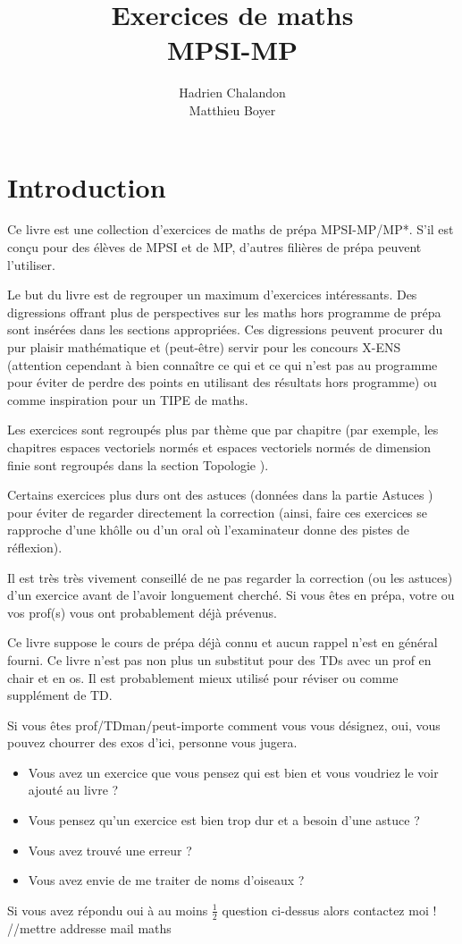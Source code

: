 \documentclass[12pt,a4paper]{book}
\title{Exercices de maths \\ MPSI-MP}
\author{Hadrien {\sc Chalandon} \\ Matthieu {\sc Boyer}}
\date{}
\theoremstyle{definition}
\theoremstyle{remark}
\begin{document}
\maketitle
\tableofcontents

\chapter*{Introduction}
Ce livre est une collection d'exercices de maths de prépa MPSI-MP/MP*. S'il est conçu pour des élèves de MPSI et de MP, d'autres filières de prépa peuvent l'utiliser.

Le but du livre est de regrouper un maximum d'exercices intéressants. Des digressions offrant plus de perspectives sur les maths hors programme de prépa sont insérées dans les sections appropriées. Ces digressions peuvent procurer du pur plaisir mathématique et (peut-être) servir pour les concours X-ENS (attention cependant à bien connaître ce qui et ce qui n'est pas au programme pour éviter de perdre des points en utilisant des résultats hors programme) ou comme inspiration pour un TIPE de maths.

Les exercices sont regroupés plus par thème que par chapitre (par exemple, les chapitres espaces vectoriels normés et espaces vectoriels normés de dimension finie sont regroupés dans la section \og Topologie \fg).

Certains exercices plus durs ont des astuces (données dans la partie \og Astuces \fg) pour éviter de regarder directement la correction (ainsi, faire ces exercices se rapproche d'une khôlle ou d'un oral où l'examinateur donne des pistes de réflexion).

Il est très très vivement conseillé de ne pas regarder la correction (ou les astuces) d'un exercice avant de l'avoir longuement cherché. Si vous êtes en prépa, votre ou vos prof(s) vous ont probablement déjà prévenus.

Ce livre suppose le cours de prépa déjà connu et aucun rappel n'est en général fourni. Ce livre n'est pas non plus un substitut pour des TDs avec un prof en chair et en os. Il est probablement mieux utilisé pour réviser ou comme supplément de TD.

Si vous êtes prof/TDman/peut-importe comment vous vous désignez, oui, vous pouvez chourrer des exos d'ici, personne vous jugera.

\begin{itemize}
    \item Vous avez un exercice que vous pensez qui est bien et vous voudriez le voir ajouté au livre ?
    \item Vous pensez qu'un exercice est bien trop dur et a besoin d'une astuce ?
    \item Vous avez trouvé une erreur ?
    \item Vous avez envie de me traiter de noms d'oiseaux ?
\end{itemize}
Si vous avez répondu \og oui \fg à au moins $\frac{1}{2}$ question ci-dessus alors contactez moi ! //mettre addresse mail maths 
\end{document}
